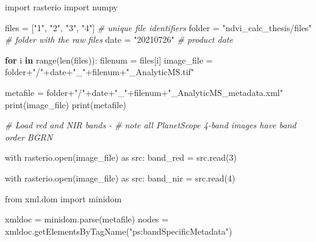 \documentclass[12pt,twoside]{reedthesis}
\newenvironment{Shaded}{\begin{snugshade}}{\end{snugshade}}
\newcommand{\CommentTok}[1]{\textcolor[rgb]{0.56,0.35,0.01}{\textit{#1}}}
\newcommand{\ControlFlowTok}[1]{\textcolor[rgb]{0.13,0.29,0.53}{\textbf{#1}}}
\newcommand{\DecValTok}[1]{\textcolor[rgb]{0.00,0.00,0.81}{#1}}
\newcommand{\FunctionTok}[1]{\textcolor[rgb]{0.00,0.00,0.00}{#1}}
\newcommand{\NormalTok}[1]{#1}
\newcommand{\OtherTok}[1]{\textcolor[rgb]{0.56,0.35,0.01}{#1}}
\newcommand{\SpecialCharTok}[1]{\textcolor[rgb]{0.00,0.00,0.00}{#1}}
\newcommand{\StringTok}[1]{\textcolor[rgb]{0.31,0.60,0.02}{#1}}
\begin{document}
\footnotesize
\begin{Shaded}
\begin{Highlighting}[]
\NormalTok{import rasterio}
\NormalTok{import numpy}

\NormalTok{files }\OtherTok{=}\NormalTok{ [}\StringTok{"1"}\NormalTok{, }\StringTok{"2"}\NormalTok{, }\StringTok{"3"}\NormalTok{, }\StringTok{"4"}\NormalTok{] }\CommentTok{\# unique file identifiers}
\NormalTok{folder }\OtherTok{=} \StringTok{"ndvi\_calc\_thesis/files"} \CommentTok{\# folder with the raw files}
\NormalTok{date }\OtherTok{=} \StringTok{"20210726"} \CommentTok{\# product date}


\ControlFlowTok{for}\NormalTok{ i }\ControlFlowTok{in} \FunctionTok{range}\NormalTok{(}\FunctionTok{len}\NormalTok{(files))}\SpecialCharTok{:}
\NormalTok{    filenum }\OtherTok{=}\NormalTok{ files[i]}
\NormalTok{    image\_file }\OtherTok{=}\NormalTok{ folder}\SpecialCharTok{+}\StringTok{"/"}\SpecialCharTok{+}\NormalTok{date}\SpecialCharTok{+}\StringTok{"\_"}\SpecialCharTok{+}\NormalTok{filenum}\SpecialCharTok{+}\StringTok{"\_AnalyticMS.tif"}

\NormalTok{    metafile }\OtherTok{=}\NormalTok{ folder}\SpecialCharTok{+}\StringTok{"/"}\SpecialCharTok{+}\NormalTok{date}\SpecialCharTok{+}\StringTok{"\_"}\SpecialCharTok{+}\NormalTok{filenum}\SpecialCharTok{+}\StringTok{"\_AnalyticMS\_metadata.xml"}
    \FunctionTok{print}\NormalTok{(image\_file)}
    \FunctionTok{print}\NormalTok{(metafile)}

    \CommentTok{\# Load red and NIR bands {-} }
    \CommentTok{\# note all PlanetScope 4{-}band images have band order BGRN}

\NormalTok{    with }\FunctionTok{rasterio.open}\NormalTok{(image\_file) as src}\SpecialCharTok{:}
\NormalTok{        band\_red }\OtherTok{=} \FunctionTok{src.read}\NormalTok{(}\DecValTok{3}\NormalTok{)}

\NormalTok{    with }\FunctionTok{rasterio.open}\NormalTok{(image\_file) as src}\SpecialCharTok{:}
\NormalTok{        band\_nir }\OtherTok{=} \FunctionTok{src.read}\NormalTok{(}\DecValTok{4}\NormalTok{)}

\NormalTok{    from xml.dom import minidom}

\NormalTok{    xmldoc }\OtherTok{=} \FunctionTok{minidom.parse}\NormalTok{(metafile)}
\NormalTok{    nodes }\OtherTok{=} \FunctionTok{xmldoc.getElementsByTagName}\NormalTok{(}\StringTok{"ps:bandSpecificMetadata"}\NormalTok{)}


\end{Highlighting}
\end{Shaded}
\end{document}
